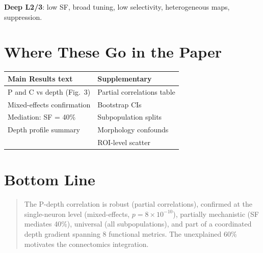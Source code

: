 \documentclass[11pt,letterpaper]{article}
\begin{document}
\textbf{Deep L2/3}: low SF, broad tuning, low selectivity, heterogeneous
maps, suppression.

\newpage
\section*{Where These Go in the Paper}

\begin{center}
\renewcommand{\arraystretch}{1.3}
\begin{tabular}{ll}
\toprule
\textbf{Main Results text} & \textbf{Supplementary} \\
\midrule
P and C vs depth (Fig.\ 3) & Partial correlations table \\
Mixed-effects confirmation & Bootstrap CIs \\
Mediation: SF = 40\% & Subpopulation splits \\
Depth profile summary & Morphology confounds \\
 & ROI-level scatter \\
\bottomrule
\end{tabular}
\end{center}

\section*{Bottom Line}

\begin{quote}
The P-depth correlation is robust (partial correlations), confirmed at
the single-neuron level (mixed-effects, $p = 8 \times 10^{-10}$),
partially mechanistic (SF mediates 40\%), universal (all subpopulations),
and part of a coordinated depth gradient spanning 8 functional metrics.
The unexplained 60\% motivates the connectomics integration.
\end{quote}
\end{document}
